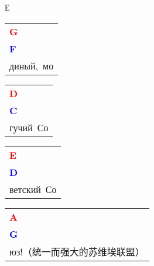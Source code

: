 \documentclass[12pt,a4paper,openany,UTF8]{memoir}
\begin{document}
Е\begin{tabular}[b]{l}
    \textbf{\textcolor{red}{G\ }}\\\textbf{\textcolor{blue}{F\ }}\\
    диный,~мо\mbox{}\end{tabular}\begin{tabular}[b]{l}
    \textbf{\textcolor{red}{D\ }}\\\textbf{\textcolor{blue}{C\ }}\\
    гучий~Со\mbox{}\end{tabular}\begin{tabular}[b]{l}
    \textbf{\textcolor{red}{E\ }}\\\textbf{\textcolor{blue}{D\ }}\\
    ветский~Со\mbox{}\end{tabular}\begin{tabular}[b]{l}
    \textbf{\textcolor{red}{A\ }}\\\textbf{\textcolor{blue}{G\ }}\\
    юз!（统一而强大的苏维埃联盟）\mbox{}\end{tabular}

    \vspace{\parskip}
\end{document}
